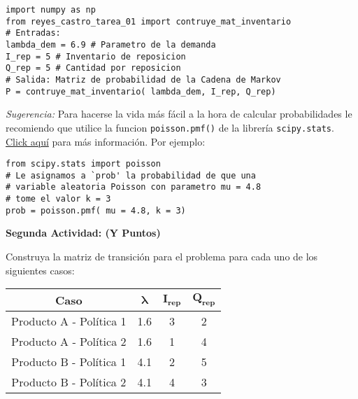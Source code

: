\documentclass[ a4paper, twoside, 11pt]{article}
\begin{document}
\begin{problem}
\begin{center}
\begin{minipage}{0.9\textwidth}
\begin{verbatim}
import numpy as np
from reyes_castro_tarea_01 import contruye_mat_inventario
# Entradas:
lambda_dem = 6.9 # Parametro de la demanda
I_rep = 5 # Inventario de reposicion
Q_rep = 5 # Cantidad por reposicion
# Salida: Matriz de probabilidad de la Cadena de Markov
P = contruye_mat_inventario( lambda_dem, I_rep, Q_rep)
\end{verbatim}
\end{minipage}
\end{center}
\fullskip

\emph{Sugerencia:} Para hacerse la vida m\'as f\'acil a la hora de calcular probabilidades le recomiendo que utilice la funcion {\tt poisson.pmf()} de la librer\'ia {\tt scipy.stats}. \href{https://docs.scipy.org/doc/scipy/reference/generated/scipy.stats.poisson.html}{Click aqu\'i} para m\'as informaci\'on. Por ejemplo: 
\halfskip

\begin{center}
\begin{minipage}{0.9\textwidth}
\begin{verbatim}
from scipy.stats import poisson
# Le asignamos a `prob' la probabilidad de que una 
# variable aleatoria Poisson con parametro mu = 4.8 
# tome el valor k = 3
prob = poisson.pmf( mu = 4.8, k = 3)
\end{verbatim}
\end{minipage}
\end{center}
\fullskip

\textbf{Segunda Actividad: (Y Puntos)}

Construya la matriz de transici\'on para el problema para cada uno de los siguientes casos: 
\begin{table}[htb]
\centering
\begin{tabular}{|c|c|c|c|}
\hline
\textbf{Caso}           & $\bm{\lambda}$ & $\bm{I_{rep}}$ & $\bm{Q_{rep}}$ \\ \hline
Producto A - Pol\'itica 1 & 1.6                & 3                  & 2                  \\ \hline
Producto A - Pol\'itica 2 & 1.6                & 1                  & 4                  \\ \hline
Producto B - Pol\'itica 1 & 4.1                & 2                  & 5                  \\ \hline
Producto B - Pol\'itica 2 & 4.1                & 4                  & 3                  \\ \hline
\end{tabular}
\end{table}


\end{problem}
\end{document}
